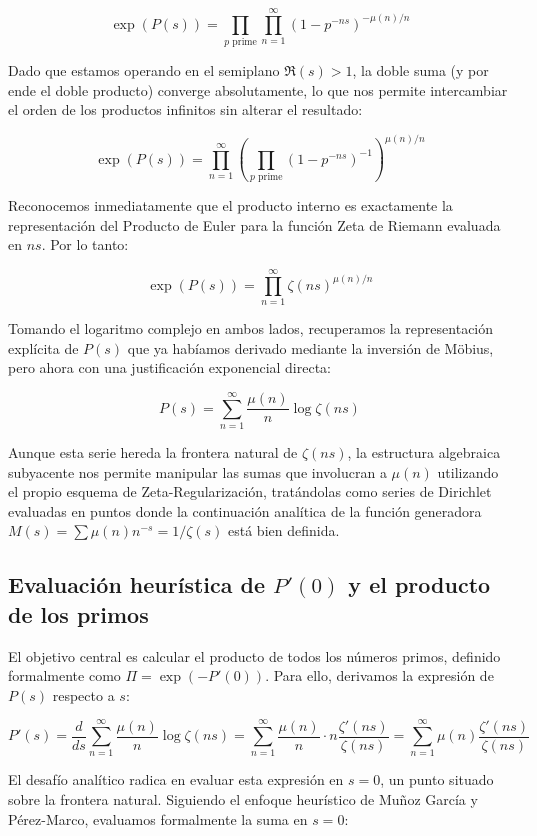 $$ \exp(P(s)) = \prod_{p \text{ prime}} \prod_{n=1}^{\infty} \left(1 - p^{-ns}\right)^{-\mu(n)/n} $$

Dado que estamos operando en el semiplano $\Re(s) > 1$, la doble suma (y por ende el doble producto) converge absolutamente, lo que nos permite intercambiar el orden de los productos infinitos sin alterar el resultado:

$$ \exp(P(s)) = \prod_{n=1}^{\infty} \left( \prod_{p \text{ prime}} \left(1 - p^{-ns}\right)^{-1} \right)^{\mu(n)/n} $$

Reconocemos inmediatamente que el producto interno es exactamente la representación del Producto de Euler para la función Zeta de Riemann evaluada en $ns$. Por lo tanto:

$$ \exp(P(s)) = \prod_{n=1}^{\infty} \zeta(ns)^{\mu(n)/n} $$

Tomando el logaritmo complejo en ambos lados, recuperamos la representación explícita de $P(s)$ que ya habíamos derivado mediante la inversión de Möbius, pero ahora con una justificación exponencial directa:

$$ P(s) = \sum_{n=1}^{\infty} \frac{\mu(n)}{n} \log \zeta(ns) $$

Aunque esta serie hereda la frontera natural de $\zeta(ns)$, la estructura algebraica subyacente nos permite manipular las sumas que involucran a $\mu(n)$ utilizando el propio esquema de Zeta-Regularización, tratándolas como series de Dirichlet evaluadas en puntos donde la continuación analítica de la función generadora $M(s) = \sum \mu(n) n^{-s} = 1/\zeta(s)$ está bien definida.

\subsection{Evaluación heurística de $P'(0)$ y el producto de los primos}

El objetivo central es calcular el producto de todos los números primos, definido formalmente como $\Pi = \exp(-P'(0))$. Para ello, derivamos la expresión de $P(s)$ respecto a $s$:

$$ P'(s) = \frac{d}{ds} \sum_{n=1}^{\infty} \frac{\mu(n)}{n} \log \zeta(ns) = \sum_{n=1}^{\infty} \frac{\mu(n)}{n} \cdot n \frac{\zeta'(ns)}{\zeta(ns)} = \sum_{n=1}^{\infty} \mu(n) \frac{\zeta'(ns)}{\zeta(ns)} $$

El desafío analítico radica en evaluar esta expresión en $s=0$, un punto situado sobre la frontera natural. Siguiendo el enfoque heurístico de Muñoz García y Pérez-Marco, evaluamos formalmente la suma en $s=0$:

